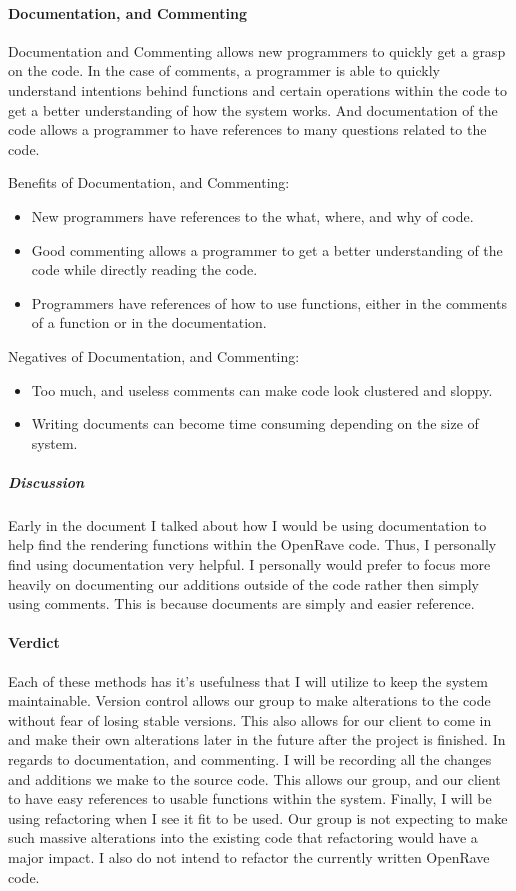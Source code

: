 \paragraph{Documentation, and Commenting}
Documentation and Commenting allows new programmers to quickly get a grasp on the code.
In the case of comments, a programmer is able to quickly understand intentions behind functions and certain operations within the code to get a better understanding of how the system works.
And documentation of the code allows a programmer to have references to many questions related to the code.

Benefits of Documentation, and Commenting:
\begin{itemize}
\item New programmers have references to the what, where, and why of code.
\item Good commenting allows a programmer to get a better understanding of the code while directly reading the code.
\item Programmers have references of how to use functions, either in the comments of a function or in the documentation.
\end{itemize}

Negatives of Documentation, and Commenting:
\begin{itemize}
\item Too much, and useless comments can make code look clustered and sloppy.
\item Writing documents can become time consuming depending on the size of system.
\end{itemize}

\subparagraph{Discussion}
Early in the document I talked about how I would be using documentation to help find the rendering functions within the OpenRave code.
Thus, I personally find using documentation very helpful.
I personally would prefer to focus more heavily on documenting our additions outside of the code rather then simply using comments.
This is because documents are simply and easier reference.

\paragraph{Verdict}
Each of these methods has it's usefulness that I will utilize to keep the system maintainable.
Version control allows our group to make alterations to the code without fear of losing stable versions.
This also allows for our client to come in and make their own alterations later in the future after the project is finished.
In regards to documentation, and commenting.
I will be recording all the changes and additions we make to the source code.
This allows our group, and our client to have easy references to usable functions within the system.
Finally, I will be using refactoring when I see it fit to be used.
Our group is not expecting to make such massive alterations into the existing code that refactoring would have a major impact.
I also do not intend to refactor the currently written OpenRave code.

